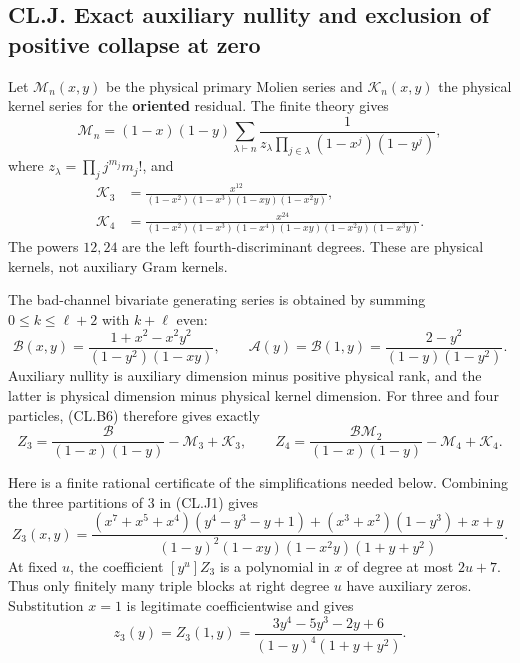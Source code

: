 \documentclass[a4paper,11pt]{article}
\numberwithin{equation}{section}
\begin{document}
\hypertarget{cl.j.-exact-auxiliary-nullity-and-exclusion-of-positive-collapse-at-zero}{%
\subsection{CL.J. Exact auxiliary nullity and exclusion of positive collapse at zero}\label{cl.j.-exact-auxiliary-nullity-and-exclusion-of-positive-collapse-at-zero}}

Let \(\mathcal M_n(x,y)\) be the physical primary Molien series and \(\mathcal K_n(x,y)\) the physical kernel series for the \textbf{oriented} residual. The finite theory gives \[
\mathcal M_n=(1-x)(1-y)
\sum_{\lambda\vdash n}
\frac1{z_\lambda\prod_{j\in\lambda}(1-x^j)(1-y^j)},
\tag{CL.J1}
\] where \(z_\lambda=\prod_jj^{m_j}m_j!\), and \[
\begin{aligned}
\mathcal K_3&=\frac{x^{12}}
{(1-x^2)(1-x^3)(1-xy)(1-x^2y)},\\
\mathcal K_4&=\frac{x^{24}}
{(1-x^2)(1-x^3)(1-x^4)(1-xy)(1-x^2y)(1-x^3y)}.
\end{aligned}
\tag{CL.J2}
\] The powers \(12,24\) are the left fourth-discriminant degrees. These are physical kernels, not auxiliary Gram kernels.

The bad-channel bivariate generating series is obtained by summing \(0\leq k\leq\ell+2\) with \(k+\ell\) even: \[
\mathcal B(x,y)
=\frac{1+x^2-x^2y^2}{(1-y^2)(1-xy)},\qquad
\mathcal A(y)=\mathcal B(1,y)
=\frac{2-y^2}{(1-y)(1-y^2)}.
\tag{CL.J3}
\] Auxiliary nullity is auxiliary dimension minus positive physical rank, and the latter is physical dimension minus physical kernel dimension. For three and four particles, (CL.B6) therefore gives exactly \[
Z_3=\frac{\mathcal B}{(1-x)(1-y)}-\mathcal M_3+\mathcal K_3,\qquad
Z_4=\frac{\mathcal B\mathcal M_2}{(1-x)(1-y)}
-\mathcal M_4+\mathcal K_4.
\tag{CL.J4}
\]

Here is a finite rational certificate of the simplifications needed below. Combining the three partitions of \(3\) in (CL.J1) gives \[
Z_3(x,y)=
\frac{(x^7+x^5+x^4)(y^4-y^3-y+1)
+(x^3+x^2)(1-y^3)+x+y}
{(1-y)^2(1-xy)(1-x^2y)(1+y+y^2)}.
\tag{CL.J5}
\] At fixed \(u\), the coefficient \([y^u]Z_3\) is a polynomial in \(x\) of degree at most \(2u+7\). Thus only finitely many triple blocks at right degree \(u\) have auxiliary zeros. Substitution \(x=1\) is legitimate coefficientwise and gives \[
z_3(y)=Z_3(1,y)
=\frac{3y^4-5y^3-2y+6}{(1-y)^4(1+y+y^2)}.
\tag{CL.J6}
\]
\end{document}
